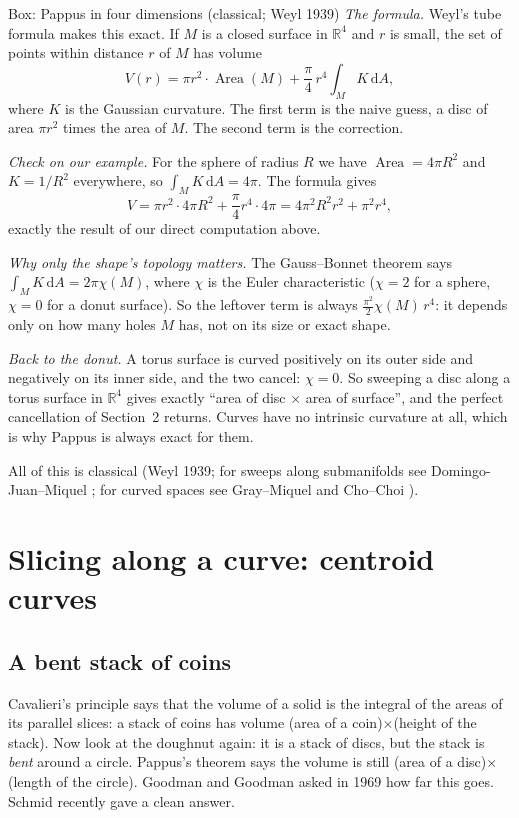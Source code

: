 \documentclass[11pt]{article}
\theoremstyle{plain}
\theoremstyle{definition}
\theoremstyle{remark}
\newcommand{\R}{\mathbb{R}}
\newcommand{\dd}{\,\mathrm{d}}
\begin{document}
\begin{sidebox}{Box: Pappus in four dimensions (classical; Weyl 1939)}
\emph{The formula.} Weyl's tube formula \cite{weyl,gray-tubes} makes this exact. If $M$ is a closed surface in $\R^4$ and $r$ is small, the set of points within distance $r$ of $M$ has volume
\[
  V(r)=\pi r^2\cdot\operatorname{Area}(M)+\frac{\pi}{4}\,r^4\int_M K\dd A ,
\]
where $K$ is the Gaussian curvature. The first term is the naive guess, a disc of area $\pi r^2$ times the area of $M$. The second term is the correction.

\emph{Check on our example.} For the sphere of radius $R$ we have $\operatorname{Area}=4\pi R^2$ and $K=1/R^2$ everywhere, so $\int_M K\dd A=4\pi$. The formula gives
\[
  V=\pi r^2\cdot 4\pi R^2+\frac{\pi}{4}r^4\cdot 4\pi=4\pi^2R^2r^2+\pi^2r^4,
\]
exactly the result of our direct computation above.

\emph{Why only the shape's topology matters.} The Gauss--Bonnet theorem says $\int_M K\dd A=2\pi\chi(M)$, where $\chi$ is the Euler characteristic ($\chi=2$ for a sphere, $\chi=0$ for a donut surface). So the leftover term is always $\tfrac{\pi^2}{2}\chi(M)\,r^4$: it depends only on how many holes $M$ has, not on its size or exact shape.

\emph{Back to the donut.} A torus surface is curved positively on its outer side and negatively on its inner side, and the two cancel: $\chi=0$. So sweeping a disc along a torus surface in $\R^4$ gives exactly ``area of disc $\times$ area of surface'', and the perfect cancellation of Section~2 returns. Curves have no intrinsic curvature at all, which is why Pappus is always exact for them.

All of this is classical (Weyl 1939; for sweeps along submanifolds see Domingo-Juan--Miquel \cite{domingo-miquel}; for curved spaces see Gray--Miquel \cite{gray-miquel} and Cho--Choi \cite{cho-choi}).
\end{sidebox}

\section{Slicing along a curve: centroid curves}\label{sec:centroid}

\subsection{A bent stack of coins}
Cavalieri's principle says that the volume of a solid is the integral of the areas of its parallel slices: a stack of coins has volume (area of a coin)$\times$(height of the stack). Now look at the doughnut again: it is a stack of discs, but the stack is \emph{bent} around a circle. Pappus's theorem says the volume is still (area of a disc)$\times$(length of the circle). Goodman and Goodman \cite{goodman} asked in 1969 how far this goes. Schmid \cite{schmid} recently gave a clean answer.
\end{document}
